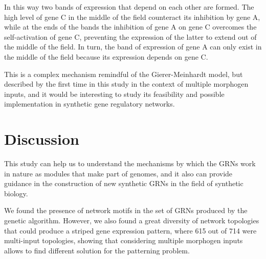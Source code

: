 \documentclass[10pt,letterpaper]{article}
\begin{document}

In this way two bands of expression that depend on each other are formed. The
high level of gene C in the middle of the field counteract its inhibition by
gene A, while at the ends of the bands the inhibition of gene A on gene C
overcomes the self-activation of gene C, preventing the expression of the
latter to extend out of the middle of the field. In turn, the band of
expression of gene A can only exist in the middle of the field because its
expression depends on gene C.

This is a complex mechanism remindful of the Gierer-Meinhardt model, but
described by the first time in this study in the context of multiple morphogen
inputs, and it would be interesting to study its feasibility and possible
implementation in synthetic gene regulatory networks.

\section*{Discussion}

This study can help us to understand the mechanisms by which the GRNs work in
nature as modules that make part of genomes, and it also can provide guidance
in the construction of new synthetic GRNs in the field of synthetic biology.

We found the presence of network motifs in the set of GRNs produced by the
genetic algorithm. However, we also found a great diversity of network
topologies that could produce a striped gene expression pattern, where 615 out of
714 were multi-input topologies, showing that considering multiple
morphogen inputs allows to find different solution for the patterning
problem.\\
\end{document}

